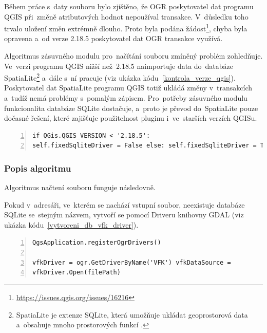Během práce s~daty souboru  bylo zjištěno, že OGR poskytovatel
dat programu QGIS při~změně atributových hodnot nepoužíval
transakce. V~důsledku toho trvalo uložení změn extrémně dlouho. Proto
byla podána
žádost\footnote{\url{https://issues.qgis.org/issues/16216}}, chyba
byla opravena a~od verze 2.18.5 poskytovatel dat OGR transakce
využívá.

Algoritmus zásuvného modulu pro~načítání  souboru zmíněný
problém zo\-hledňuje. Ve~verzi programu QGIS nižší než~2.18.5
naimportuje data do~databáze SpatiaLite\footnote{SpatiaLite je extenze
SQLite, která umožňuje ukládat geoprostorová data a~obsahuje mnoho
prostorových funkcí \citep{spatialite} \citep{wiki_spatialite}.}
a~dále s~ní pracuje (viz ukázka
kódu~\ref{kontrola_verze_qgis}). Poskytovatel dat SpatiaLite programu
QGIS totiž ukládá změny v~transakcích a~tudíž nemá problémy s~pomalým
zápisem. Pro~potřeby zásuvného modulu funkcionalita databáze SQLite
dostačuje, a~proto je převod do~SpatiaLite pouze dočasné řešení, které
zajišťuje použitelnost pluginu i~ve~starších verzích QGISu.

{\scriptsize
\begin{lstlisting}[style=python, caption={Kontrola verze programu
QGIS}, captionpos=b, label=kontrola_verze_qgis, backgroundcolor =
\color{light-gray}, numbers=left] if QGis.QGIS_VERSION < '2.18.5':
self.fixedSqliteDriver = False else: self.fixedSqliteDriver = True
\end{lstlisting}}

\subsubsection{Popis algoritmu}
\label{popis_algoritmu_nacteni_vfk}

Algoritmus načtení  souboru funguje následovně.

Pokud v~adresáři, ve~kterém se nachází vstupní  soubor,
neexistuje databáze SQLite se~stejným názvem, vytvoří se pomocí
 Driveru knihovny GDAL (viz ukázka
kódu~\ref{vytvoreni_db_vfk_driver}).

{\scriptsize
\begin{lstlisting}[style=python, caption={Vytvoření SQLite databáze
pomocí VFK Driveru}, captionpos=b, label=vytvoreni_db_vfk_driver,
backgroundcolor = \color{light-gray}, numbers=left]
QgsApplication.registerOgrDrivers()

vfkDriver = ogr.GetDriverByName('VFK') vfkDataSource =
vfkDriver.Open(filePath)
\end{lstlisting}}

